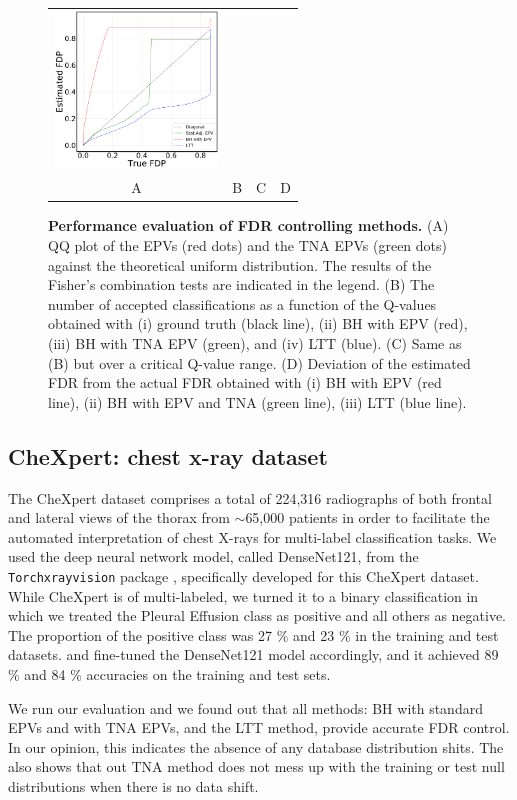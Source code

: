\documentclass{article}
\begin{document}
\begin{figure}[h!]
\begin{tabular}{cccc}
		\includegraphics[width=1.7in]{img/cnn_FDPscat_cells_balanced01.png}\\			
		A & B & C & D
	\end{tabular}
	\caption{{\bf Performance evaluation of FDR controlling methods.} (A) QQ plot of the EPVs (red dots) and the TNA EPVs (green dots) against the theoretical uniform distribution. The results of the Fisher's combination tests are indicated in the legend. (B) The number of accepted classifications as a function of the Q-values obtained with (i) ground truth (black line), (ii) BH with EPV (red), (iii) BH with TNA EPV (green), and (iv) LTT (blue). (C) Same as (B) but over a critical Q-value range. (D) Deviation of the estimated FDR from the actual FDR obtained with (i) BH with EPV (red line), (ii) BH with EPV and TNA (green line), (iii) LTT (blue line).}
	\label{fig:pcam}
\end{figure} 
\subsection{CheXpert: chest x-ray dataset}

The CheXpert dataset comprises a total of 224,316 radiographs of both frontal and lateral views of the thorax from $\sim$65,000 patients in order to facilitate the automated interpretation of chest X-rays for multi-label classification tasks. We used the deep neural network model, called DenseNet121, from the \texttt{Torchxrayvision} package \cite{cohen2020limits,Cohen2022xrv}, specifically developed for this CheXpert dataset. While CheXpert is of multi-labeled, we turned it to a binary classification in which we treated the Pleural Effusion class as positive and all others as negative. The proportion of the positive class was 27 \% and 23 \% in the training and test datasets. and fine-tuned the DenseNet121 model accordingly, and it achieved 89 \% and 84 \% accuracies on the training and test sets.

We run our evaluation and we found out that all methods: BH with standard EPVs and with TNA EPVs, and the LTT method, provide accurate FDR control. In our opinion, this indicates the absence of any database distribution shits. The also shows that out TNA method does not mess up with the training or test null distributions when there is no data shift.
\end{document}
